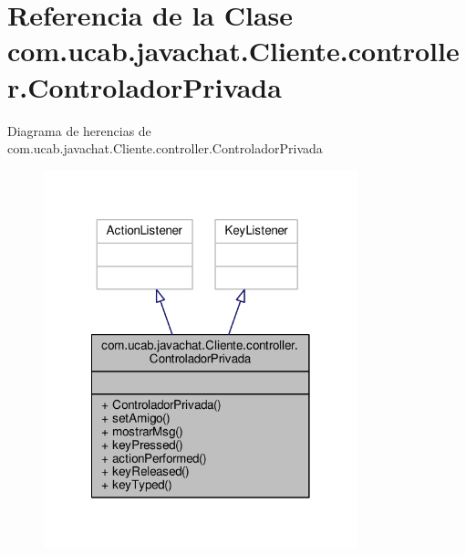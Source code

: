 \hypertarget{classcom_1_1ucab_1_1javachat_1_1_cliente_1_1controller_1_1_controlador_privada}{\section{Referencia de la Clase com.\-ucab.\-javachat.\-Cliente.\-controller.\-Controlador\-Privada}
\label{classcom_1_1ucab_1_1javachat_1_1_cliente_1_1controller_1_1_controlador_privada}
}


Diagrama de herencias de com.\-ucab.\-javachat.\-Cliente.\-controller.\-Controlador\-Privada\nopagebreak
\begin{figure}[H]
\begin{center}
\leavevmode
\includegraphics[width=258pt]{classcom_1_1ucab_1_1javachat_1_1_cliente_1_1controller_1_1_controlador_privada__inherit__graph}
\end{center}
\end{figure}


